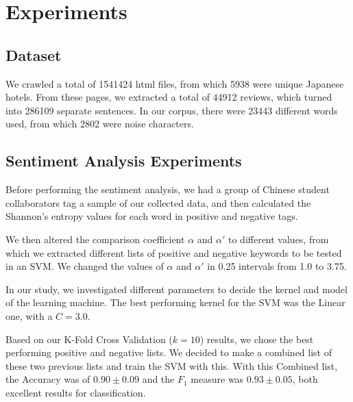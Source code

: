 \documentclass[review]{elsarticle}
\begin{document}
\section{Experiments}\label{experiments}

\subsection{Dataset}\label{dataset}

We crawled a total of \num[group-separator={,}]{1541424} html files, from which \num[group-separator={,}]{5938} were unique Japanese hotels. From these pages, we extracted a total of \num[group-separator={,}]{44912} reviews, which turned into \num[group-separator={,}]{286109} separate sentences. In our corpus, there were \num[group-separator={,}]{23443} different words used, from which \num[group-separator={,}]{2802} were noise characters.

\subsection{Sentiment Analysis Experiments}\label{sentiment_experiments}

Before performing the sentiment analysis, we had a group of Chinese student collaborators tag a sample of our collected data, and then calculated the Shannon’s entropy values for each word in positive and negative tags.

We then altered the comparison coefficient \(\alpha\) and \(\alpha'\) to different values, from which we extracted different lists of positive and negative keywords to be tested in an SVM. We changed the values of \(\alpha\) and \(\alpha'\) in 0.25 intervals from 1.0 to 3.75.

In our study, we investigated different parameters to decide the kernel and model of the learning machine. The best performing kernel for the SVM was the Linear one, with a \(C=3.0\).

Based on our K-Fold Cross Validation (\(k=10\)) results, we chose the best performing positive and negative lists. We decided to make a combined list of these two previous lists and train the SVM with this. With this Combined list, the Accuracy was of \(0.90 \pm 0.09\) and the \(F_1\) measure was \(0.93 \pm 0.05\), both excellent results for classification.
\end{document}
